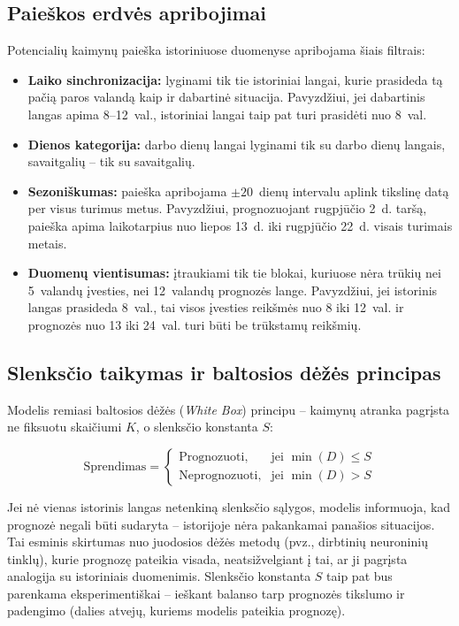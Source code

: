 \documentclass[]{VUMIFTemplateClass}
\begin{document}
    \subsection{Paieškos erdvės apribojimai}

    Potencialių kaimynų paieška istoriniuose duomenyse apribojama šiais filtrais:
    \begin{itemize}
        \item \textbf{Laiko sinchronizacija:} lyginami tik tie istoriniai langai, kurie prasideda tą pačią paros valandą kaip ir dabartinė situacija. Pavyzdžiui, jei dabartinis langas apima 8--12~val., istoriniai langai taip pat turi prasidėti nuo 8~val.
        \item \textbf{Dienos kategorija:} darbo dienų langai lyginami tik su darbo dienų langais, savaitgalių -- tik su savaitgalių.
        \item \textbf{Sezoniškumas:} paieška apribojama $\pm 20$~dienų intervalu aplink tikslinę datą per visus turimus metus. Pavyzdžiui, prognozuojant rugpjūčio 2~d. taršą, paieška apima laikotarpius nuo liepos 13~d. iki rugpjūčio 22~d. visais turimais metais.
        \item \textbf{Duomenų vientisumas:} įtraukiami tik tie blokai, kuriuose nėra trūkių nei 5~valandų įvesties, nei 12~valandų prognozės lange. Pavyzdžiui, jei istorinis langas prasideda 8~val., tai visos įvesties reikšmės nuo 8 iki 12~val. ir prognozės nuo 13 iki 24~val. turi būti be trūkstamų reikšmių.
    \end{itemize}

    \subsection{Slenksčio taikymas ir baltosios dėžės principas}

    Modelis remiasi baltosios dėžės (\textit{White Box}) principu -- kaimynų atranka pagrįsta ne fiksuotu skaičiumi $K$, o slenksčio konstanta $S$:

    \begin{equation}
        \text{Sprendimas} =
        \begin{cases}
            \text{Prognozuoti}, & \text{jei } \min(D) \le S \\
            \text{Neprognozuoti}, & \text{jei } \min(D) > S
        \end{cases}
        \label{eq:threshold}
    \end{equation}

    Jei nė vienas istorinis langas netenkiną slenksčio sąlygos, modelis informuoja, kad prognozė negali būti sudaryta -- istorijoje nėra pakankamai panašios situacijos.
    Tai esminis skirtumas nuo juodosios dėžės metodų (pvz., dirbtinių neuroninių tinklų), kurie prognozę pateikia visada, neatsižvelgiant į tai, ar ji pagrįsta analogija su istoriniais duomenimis.
    Slenksčio konstanta $S$ taip pat bus parenkama eksperimentiškai -- ieškant balanso tarp prognozės tikslumo ir padengimo (dalies atvejų, kuriems modelis pateikia prognozę).
\end{document}
